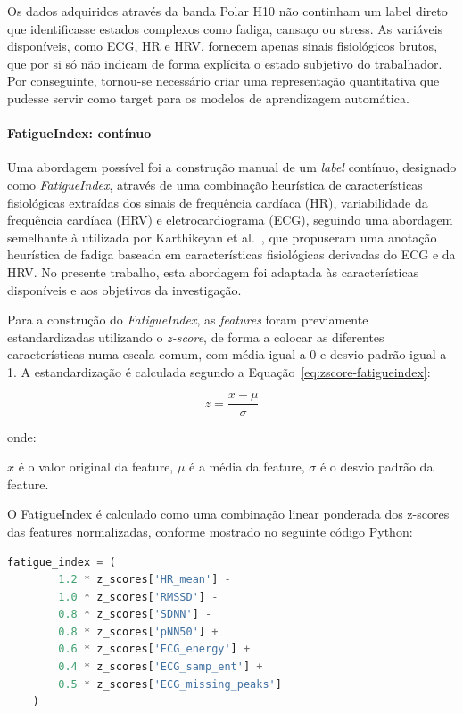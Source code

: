 Os dados adquiridos através da banda Polar H10 não continham um label direto que identificasse estados complexos como fadiga, cansaço ou stress. As variáveis disponíveis, como ECG, HR e HRV, fornecem apenas sinais fisiológicos brutos, que por si só não indicam de forma explícita o estado subjetivo do trabalhador. Por conseguinte, tornou-se necessário criar uma representação quantitativa que pudesse servir como target para os modelos de aprendizagem automática.

\paragraph{FatigueIndex: contínuo}

Uma abordagem possível foi a construção manual de um \textit{label} contínuo, designado como \textit{FatigueIndex}, através de uma combinação heurística de características fisiológicas extraídas dos sinais de frequência cardíaca (HR), variabilidade da frequência cardíaca (HRV) e eletrocardiograma (ECG), seguindo uma abordagem semelhante à utilizada por Karthikeyan et al.~\cite{karthikeyan2023}, que propuseram uma anotação heurística de fadiga baseada em características fisiológicas derivadas do ECG e da HRV. No presente trabalho, esta abordagem foi adaptada às características disponíveis e aos objetivos da investigação.

Para a construção do \textit{FatigueIndex}, as \textit{features} foram previamente estandardizadas utilizando o \textit{z-score}, de forma a colocar as diferentes características numa escala comum, com média igual a 0 e desvio padrão igual a 1. A estandardização é calculada segundo a Equação~\ref{eq:zscore-fatigueindex}:

\begin{equation}
z = \frac{x - \mu}{\sigma}
\label{eq:zscore-fatigueindex}
\end{equation}

onde:

$x$ é o valor original da feature, $\mu$ é a média da feature, $\sigma$ é o desvio padrão da feature.

O FatigueIndex é calculado como uma combinação linear ponderada dos z-scores das features normalizadas, conforme mostrado no seguinte código Python:

\begin{lstlisting}[language=Python, caption=Cálculo do FatigueIndex, label=lst:fatigueindex]
fatigue_index = (
        1.2 * z_scores['HR_mean'] -
        1.0 * z_scores['RMSSD'] -
        0.8 * z_scores['SDNN'] -
        0.8 * z_scores['pNN50'] +
        0.6 * z_scores['ECG_energy'] +
        0.4 * z_scores['ECG_samp_ent'] +
        0.5 * z_scores['ECG_missing_peaks']
    )
\end{lstlisting}

